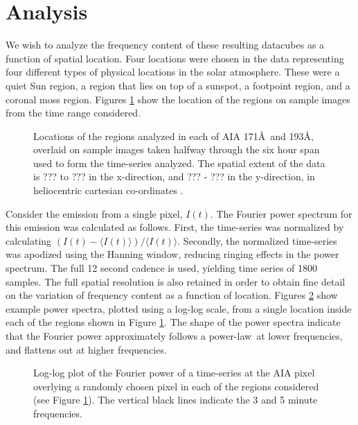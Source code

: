 \documentclass{aastex}
\newcommand{\PS}{power spectrum}
\newcommand{\PL}{power-law}
\begin{document}
{\section{Analysis}\label{sec:anal}
We wish to analyze the frequency content of these resulting datacubes
as a function of spatial location.  Four locations were chosen in the
data representing four different types of physical locations in the
solar atmosphere.  These were a quiet Sun region, a region that lies
on top of a sunspot, a footpoint region, and a coronal moss region.
Figures \ref{fig:loc171193} show the location of the regions on sample
images from the time range considered.

\begin{figure}
\caption{Locations of the regions analyzed in each of AIA 171\AA\ and
  193\AA, overlaid on sample images taken halfway through the six hour
  span used to form the time-series analyzed.  The spatial extent of
  the data is ??? to ??? in the x-direction, and ??? - ??? in the
  y-direction, in heliocentric cartesian co-ordinates
  \citep{2006A&A...449..791T}.}
\label{fig:loc171193}
\end{figure}

Consider the emission from a single pixel, $I(t)$.  The Fourier power
spectrum for this emission was calculated as follows.  First, the
time-series was normalized by calculating $(I(t) - \langle I(t)
\rangle)/\langle I(t) \rangle$. Secondly, the normalized time-series
was apodized using the Hanning window, reducing ringing effects in the
\PS.  The full 12 second cadence is used, yielding time series of 1800
samples.  The full spatial resolution is also retained in order to
obtain fine detail on the variation of frequency content as a function
of location.  Figures \ref{fig:compare171193} show example power
spectra, plotted using a log-log scale, from a single location inside
each of the regions shown in Figure \ref{fig:loc171193}.  The shape of
the power spectra indicate that the Fourier power approximately
follows a \PL\ at lower frequencies, and flattens out at higher
frequencies.

\begin{figure}
\caption{Log-log plot of the Fourier power of a time-series at the AIA
  pixel overlying a randomly chosen pixel in each of the regions
  considered (see Figure \protect\ref{fig:loc171193}).  The vertical
  black lines indicate the 3 and 5 minute frequencies.}
\label{fig:compare171193}
\end{figure}

}
\end{document}
